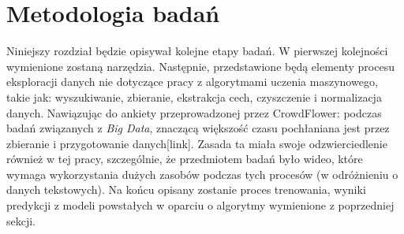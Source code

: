 
\chapter{Metodologia badań}
Niniejszy rozdział będzie opisywał kolejne etapy badań. W pierwszej kolejności wymienione zostaną narzędzia. Następnie, przedstawione będą elementy procesu eksploracji danych nie dotyczące pracy z algorytmami uczenia maszynowego, takie jak: wyszukiwanie, zbieranie, ekstrakcja cech, czyszczenie i normalizacja danych. Nawiązując do ankiety przeprowadzonej przez CrowdFlower: podczas badań związanych z {\em Big Data}, znaczącą większość czasu pochłaniana jest przez zbieranie i przygotowanie danych[link]. Zasada ta miała swoje odzwierciedlenie również w tej pracy, szczególnie, że przedmiotem badań było wideo, które wymaga wykorzystania dużych zasobów podczas tych procesów (w odróżnieniu o danych tekstowych). Na końcu opisany zostanie proces trenowania, wyniki predykcji z modeli powstałych w oparciu o algorytmy wymienione z poprzedniej sekcji.
\label{cha:pierwszyDokument}

